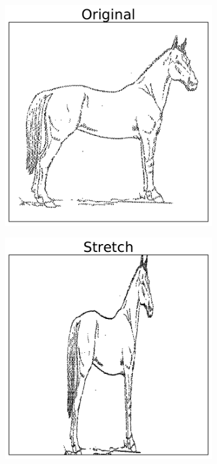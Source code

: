 \begin{figure}[h] %
\captionsetup[subfigure]{justification=centering}
\centering
\begin{subfigure}{.32\textwidth}
    \centering
    \includegraphics[width=\linewidth]{OriginalHorse.pdf}
\end{subfigure}
%
\begin{subfigure}{.32\textwidth}
    \centering
    \includegraphics[width=\linewidth]{StretchHorse.pdf}

\end{subfigure}
\end{figure}
